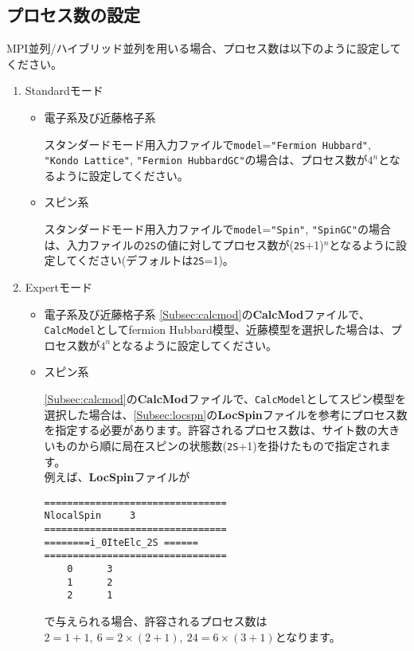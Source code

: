 \newpage
\subsection{プロセス数の設定}
\label{SetProcess}
{MPI並列/ハイブリッド並列を用いる場合、プロセス数は以下のように設定してください。}
\begin{enumerate}
\item{Standardモード}

\begin{itemize}
\item{電子系及び近藤格子系 }

スタンダードモード用入力ファイルで\verb|model|=\verb|"Fermion Hubbard"|, \\
\verb|"Kondo Lattice"|, \verb|"Fermion HubbardGC"|の場合は、プロセス数が$4^n$となるように設定してください。

\item{スピン系}

スタンダードモード用入力ファイルで\verb|model|=\verb|"Spin"|, \verb|"SpinGC"|の場合は、入力ファイルの\verb|2S|の値に対してプロセス数が(\verb|2S|+1)${}^n$となるように設定してください(デフォルトは\verb|2S|=1)。
\end{itemize}
\item{Expertモード}

\begin{itemize}
\item{電子系及び近藤格子系 }
\ref{Subsec:calcmod}の{\bf CalcMod}ファイルで、\verb|CalcModel|としてfermion Hubbard模型、近藤模型を選択した場合は、プロセス数が$4^n$となるように設定してください。

\item{スピン系 }

\ref{Subsec:calcmod}の{\bf CalcMod}ファイルで、\verb|CalcModel|としてスピン模型を選択した場合は、\ref{Subsec:locspn}の{\bf LocSpin}ファイルを参考にプロセス数を指定する必要があります。許容されるプロセス数は、サイト数の大きいものから順に局在スピンの状態数(\verb|2S|+1)を掛けたもので指定されます。\\
例えば、{\bf LocSpin}ファイルが

\begin{minipage}{10cm}
\begin{screen}
\begin{verbatim}
================================ 
NlocalSpin     3
================================ 
========i_0IteElc_2S ====== 
================================ 
    0      3
    1      2
    2      1
\end{verbatim}
\end{screen}
\end{minipage}

で与えられる場合、許容されるプロセス数は$2=1+1,~6=2\times(2+1),~24=6\times(3+1)$となります。

\end{itemize}

\end{enumerate}

